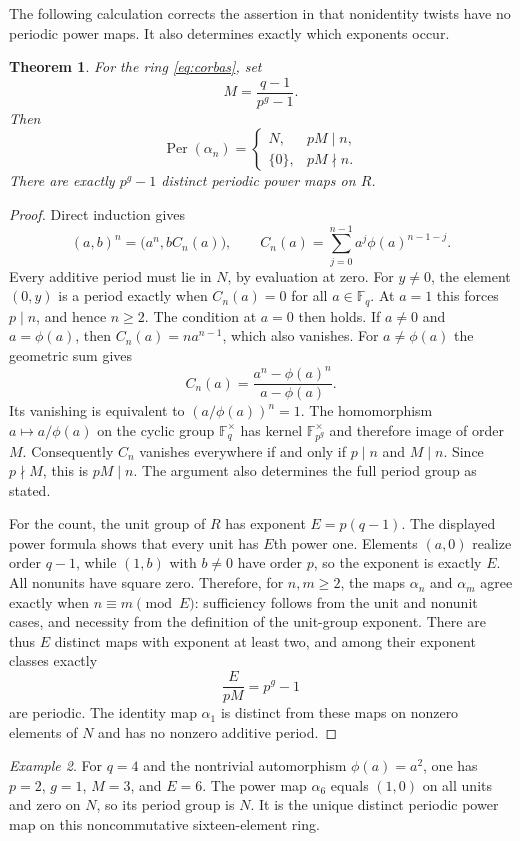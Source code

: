 \documentclass[11pt]{article}
\newtheorem{theorem}{Theorem}
\theoremstyle{remark}
\newtheorem{example}[theorem]{Example}
\DeclareMathOperator{\Per}{Per}
\begin{document}
The following calculation corrects the assertion in
\cite[Example~2.2 and Table~1]{Burnette} that nonidentity twists have no
periodic power maps. It also determines exactly which exponents occur.

\begin{theorem}\label{thm:corbas}
For the ring \eqref{eq:corbas}, set
\[
 M=\frac{q-1}{p^g-1}.
\]
Then
\[
 \Per(\alpha_n)=
 \begin{cases}
 N,&pM\mid n,\\
 \{0\},&pM\nmid n.
 \end{cases}
\]
There are exactly $p^g-1$ distinct periodic power maps on $R$.
\end{theorem}
\begin{proof}
Direct induction gives
\[
 (a,b)^n=\bigl(a^n,bC_n(a)\bigr),\qquad
 C_n(a)=\sum_{j=0}^{n-1}a^j\phi(a)^{n-1-j}.
\]
Every additive period must lie in $N$, by evaluation at zero. For $y\ne0$,
the element $(0,y)$ is a period exactly when $C_n(a)=0$ for all
$a\in\mathbb F_q$. At $a=1$ this forces $p\mid n$, and hence $n\geq2$.
The condition at $a=0$ then holds. If $a\ne0$ and $a=\phi(a)$, then
$C_n(a)=na^{n-1}$, which also vanishes. For $a\ne\phi(a)$ the geometric
sum gives
\[
 C_n(a)=\frac{a^n-\phi(a)^n}{a-\phi(a)}.
\]
Its vanishing is equivalent to $(a/\phi(a))^n=1$.
The homomorphism $a\mapsto a/\phi(a)$ on the cyclic group
$\mathbb F_q^\times$ has kernel $\mathbb F_{p^g}^\times$ and therefore
image of order $M$. Consequently $C_n$ vanishes everywhere if and only
if $p\mid n$ and $M\mid n$. Since $p\nmid M$, this is $pM\mid n$.
The argument also determines the full period group as stated.

For the count, the unit group of $R$ has exponent $E=p(q-1)$.
The displayed power formula shows that every unit has $E$th power one.
Elements $(a,0)$ realize order $q-1$, while $(1,b)$ with $b\ne0$ have
order $p$, so the exponent is exactly $E$.
All nonunits have square zero. Therefore, for $n,m\geq2$, the maps
$\alpha_n$ and $\alpha_m$ agree exactly when $n\equiv m\pmod E$:
sufficiency follows from the unit and nonunit cases, and necessity from
the definition of the unit-group exponent.
There are thus $E$ distinct maps with exponent at least two, and among
their exponent classes exactly
\[
 \frac{E}{pM}=p^g-1
\]
are periodic. The identity map $\alpha_1$ is distinct from these maps on
nonzero elements of $N$ and has no nonzero additive period.
\end{proof}

\begin{example}
For $q=4$ and the nontrivial automorphism $\phi(a)=a^2$, one has
$p=2$, $g=1$, $M=3$, and $E=6$. The power map $\alpha_6$ equals
$(1,0)$ on all units and zero on $N$, so its period group is $N$.
It is the unique distinct periodic power map on this noncommutative
sixteen-element ring.
\end{example}
\end{document}
